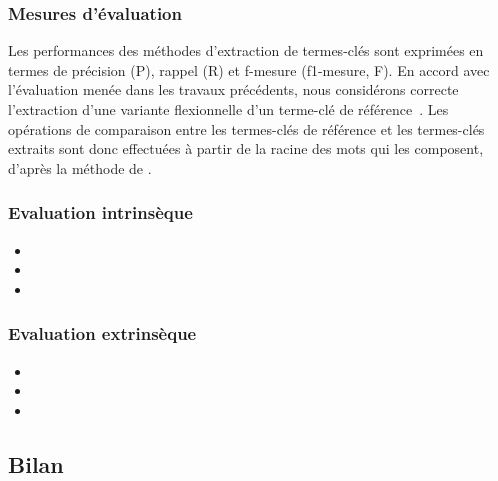       \subsubsection{Mesures d'évaluation}
      \label{subsubsec:main-automatic_keyphrase_annotation-keyphrase_candidate_selection-evaluation-evaluation_measures}

        Les performances des méthodes d'extraction de termes-clés sont exprimées
        en termes de précision (P), rappel (R) et f-mesure (f1-mesure, F). En
        accord avec l'évaluation menée dans les travaux précédents, nous
        considérons correcte l'extraction d'une variante flexionnelle d'un
        terme-clé de référence~\cite{kim2010semeval}. Les opérations de
        comparaison entre les termes-clés de référence et les termes-clés
        extraits sont donc effectuées à partir de la racine des mots qui les
        composent, d'après la méthode de .

      \subsubsection{Evaluation intrinsèque}
      \label{subsubsec:main-automatic_keyphrase_annotation-keyphrase_candidate_selection-evaluation-intrinsic_evaluation}
      \begin{itemize}
        \item{}
        \item{}
        \item{}
      \end{itemize}

      \subsubsection{Evaluation extrinsèque}
      \label{subsubsec:main-automatic_keyphrase_annotation-keyphrase_candidate_selection-evaluation-extrinsic_evaluation}
      \begin{itemize}
        \item{}
        \item{}
        \item{}
      \end{itemize}

    \subsection{Bilan}
    \label{subsec:main-automatic_keyphrase_annotation-keyphrase_candidate_selection-conclusion}

